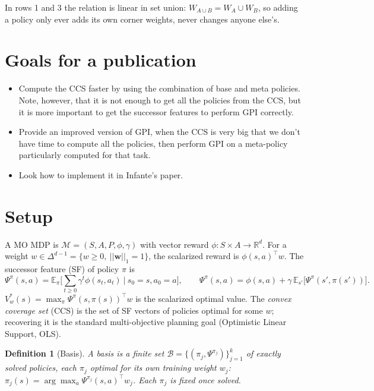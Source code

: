 \documentclass[11pt]{article}
\newtheorem{definition}{Definition}
\begin{document}
In rows 1 and 3 the relation is linear in set union: $W_{A\cup B}=W_A\cup W_B$, so adding a policy only ever adds
its own corner weights, never changes anyone else's.

\pagebreak 

\section{Goals for a publication}

\begin{itemize}
  \item  Compute the CCS faster by using the combination of base and meta policies. Note, however, that it is not enough to get all the policies from the CCS, but it is more important to get the successor features to perform GPI correctly. 
  

  \item Provide an improved version of GPI, when the CCS is very big that we don't have time to compute all the policies, then perform GPI on a meta-policy particularly computed for that task. 
  
  \item Look how to implement it in Infante's paper. 
\end{itemize}

\pagebreak 

\section{Setup}\label{sec:setup}

A MO MDP  is $\mathcal{M}=(S,A,P,\phi,\gamma)$ with vector reward
$\phi:S\times A\to\mathbb{R}^d$. For a weight $w\in\Delta^{d-1}=\{w\ge0,\ || \mathbf{w} ||_1 =1\}$,
the scalarized reward is $\phi(s,a)^\top w$. The successor feature (SF) of policy $\pi$ is
\[
\Psi^\pi(s,a) = \mathbb{E}_\pi\Big[\textstyle\sum_{t\ge0}\gamma^t\phi(s_t,a_t)\ \Big|\ s_0=s,a_0=a\Big],
\qquad
\Psi^\pi(s,a)=\phi(s,a)+\gamma\,\mathbb{E}_{s'}\big[\Psi^\pi(s',\pi(s'))\big].
\]
$V^*_w(s)=\max_\pi \Psi^\pi(s,\pi(s))^\top w$ is the scalarized optimal value. The
\emph{convex coverage set} (CCS) is the set of SF vectors of policies optimal for some $w$;
recovering it is the standard multi-objective planning goal (Optimistic Linear Support, OLS).

\begin{definition}[Basis]
A \emph{basis} is a finite set $\mathcal{B}=\{(\pi_j,\Psi^{\pi_j})\}_{j=1}^k$ of exactly solved policies,
each $\pi_j$ optimal for its own training weight $w_j$: $\pi_j(s)=\arg\max_a \Psi^{\pi_j}(s,a)^\top w_j$.
Each $\pi_j$ is fixed once solved.
\end{definition}
\end{document}
